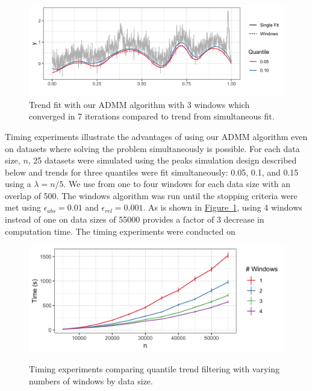 \documentclass[12pt]{article}
\newcommand{\Fig}[1]{\hyperref[fig:#1]{Figure~\ref*{fig:#1}}} %
\newcommand{\Fig}[1]{{Figure~\ref{fig:#1}}} %
\begin{document}
	
	\begin{figure}
		\centering
		\caption{Trend fit with our ADMM algorithm with 3 windows which converged in 7 iterations compared to trend from simultaneous fit.}
		\includegraphics[width = 0.8\linewidth]{Figures/admm_windows.png}
	\end{figure}

	Timing experiments illustrate the advantages of using our ADMM algorithm even on datasets where solving the problem simultaneously is possible. For each data size, $n$, 25 datasets were simulated using the peaks simulation design described below and trends for three quantiles were fit simultaneously: 0.05, 0.1, and 0.15 using a $\lambda = n/5$. We use from one to four windows for each data size with an overlap of 500. The windows algorithm was run until the stopping criteria were met using $\epsilon_{abs} = 0.01$ and $\epsilon_{rel} = 0.001$. As is shown in \Fig{timing}, using 4 windows instead of one on data sizes of 55000 provides a factor of 3 decrease in computation time. The timing experiments were conducted on   
	
	\begin{figure}[!h] 
		\centering
		\caption{Timing experiments comparing quantile trend filtering with varying numbers of windows by data size.}
		\includegraphics[width = 0.7\linewidth]{Figures/Fig_timing_experiment.png}
		\label{fig:timing}
	\end{figure}
\end{document}
